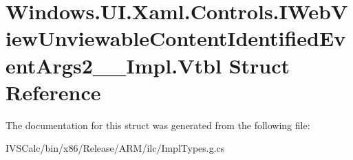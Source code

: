 \hypertarget{struct_windows_1_1_u_i_1_1_xaml_1_1_controls_1_1_i_web_view_unviewable_content_identified_event_args2_____impl_1_1_vtbl}{}\section{Windows.\+U\+I.\+Xaml.\+Controls.\+I\+Web\+View\+Unviewable\+Content\+Identified\+Event\+Args2\+\_\+\+\_\+\+Impl.\+Vtbl Struct Reference}
\label{struct_windows_1_1_u_i_1_1_xaml_1_1_controls_1_1_i_web_view_unviewable_content_identified_event_args2_____impl_1_1_vtbl}


The documentation for this struct was generated from the following file\+:\begin{DoxyCompactItemize}
\item 
I\+V\+S\+Calc/bin/x86/\+Release/\+A\+R\+M/ilc/Impl\+Types.\+g.\+cs\end{DoxyCompactItemize}

